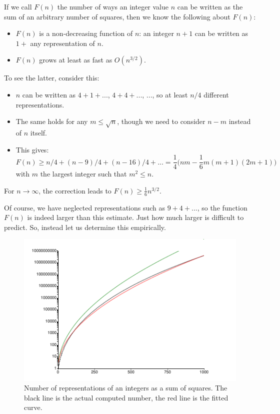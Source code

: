 \documentclass[onecolumn]{article}
\begin{document}
If we call $F(n)$ the number of ways an integer value $n$ can be written as the sum of an arbitrary number of squares,
then we know the following about $F(n)$:
\begin{itemize}
\item
$F(n)$ is a non-decreasing function of $n$: an integer $n+1$ can be written as $1 +$ any representation of $n$.
\item
$F(n)$ grows at least as fast as $O(n^{3/2})$.
\end{itemize}
To see the latter, consider this:
\begin{itemize}
\item
$n$ can be written as $4 + 1 + ...$, $4 + 4 + ...$, ..., so at least $n/4$ different representations.
\item
The same holds for any $m \leq \sqrt{n}$, though we need to consider $n - m$ instead of $n$ itself.
\item
This gives:
\begin{equation}
    F(n) \geq n/4 + (n-9)/4 + (n-16)/4 + ... = \frac{1}{4} \bigl(n m - \frac{1}{6}m(m+1)(2m+1) \bigr)
\end{equation}
\noindent with $m$ the largest integer such that $m^2 \leq n$.
\end{itemize}

For $n \rightarrow \infty$, the correction leads to $F(n) \geq \frac{1}{6} n^{3/2}$.

Of course, we have neglected representations such as $9 + 4 + ...$, so the function $F(n)$ is indeed larger
than this estimate. Just how much larger is difficult to predict. So, instead let us determine this empirically.

\begin{figure}
\center
\caption{Number of representations of an integers as a sum of squares. The black line is the actual computed
number, the red line is the fitted curve.}
\label{numberReps}
\includegraphics{squares.pdf}
\end{figure}
\end{document}

